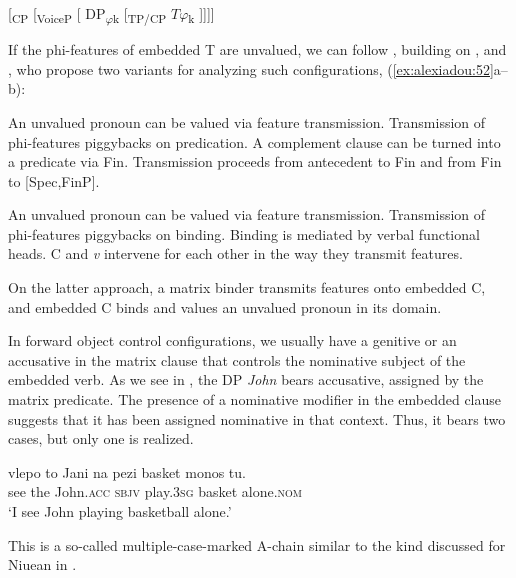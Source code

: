 \documentclass[output=paper]{langsci/langscibook}
\begin{document}
\ea%
    \label{ex:alexiadou:51}
    [\textsubscript{CP} [\textsubscript{VoiceP} [ DP\textsubscript{$\varphi $}\textsubscript{k} [\textsubscript{TP/CP}    $T\varphi $\textsubscript{k}    ]]]]
    \z

If the phi-features of embedded T are unvalued, we can follow \citet{Grano2016}, building on \citet{Kratzer2009}, and \citet{Landau2015}, who propose two variants for analyzing such configurations, (\ref{ex:alexiadou:52}a--b):


\ea%
    \label{ex:alexiadou:52}
    \ea
    \begin{xlisti}
    \ex An unvalued pronoun can be valued via feature transmission.
    \ex Transmission of phi-features piggybacks on predication.
    \ex A complement clause can be turned into a predicate via Fin.
    \ex Transmission proceeds from antecedent to Fin and from Fin to [Spec,FinP].
    \end{xlisti}
    \ex
    \begin{xlisti}
    \ex An unvalued pronoun can be valued via feature transmission.
    \ex Transmission of phi-features piggybacks on binding.
    \ex Binding is mediated by verbal functional heads.
    \ex C and \textit{v} intervene for each other in the way they transmit features.
    \end{xlisti}
    \z
\z

On the latter approach, a matrix binder transmits features onto embedded C, and embedded C binds and values an unvalued pronoun in its  domain.

In forward object control configurations, we usually have a genitive or an accusative in the matrix clause that controls the nominative subject of the embedded verb. As we see in , the DP \textit{John} bears accusative, assigned by the matrix predicate. The presence of a nominative modifier in the embedded clause suggests that it has been assigned nominative in that context. Thus, it bears two cases, but only one is realized.

\ea%
    \label{ex:alexiadou:53}
    \gll vlepo to    Jani        na   pezi        basket  {monos tu}.\\
         see     the John.\textsc{acc} \textsc{sbjv} play.\textsc{3sg} basket  alone.\textsc{nom}\\
    \glt ‘I see John playing basketball alone.’
    \z

This is a so-called multiple-case-marked A-chain similar to the kind discussed for Niuean in \citet[67]{Bejar1999}.
\end{document}
